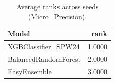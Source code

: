 \begin{table}[t]
\centering
\begin{tabular}{lr}
\toprule
Model & rank \\
\midrule
XGBClassifier_SPW24 & 1.0000 \\
BalancedRandomForest & 2.0000 \\
EasyEnsemble & 3.0000 \\
\bottomrule
\end{tabular}
\caption{Average ranks across seeds (Micro_Precision).}
\label{tab:avg_rank_Micro_Precision}
\end{table}